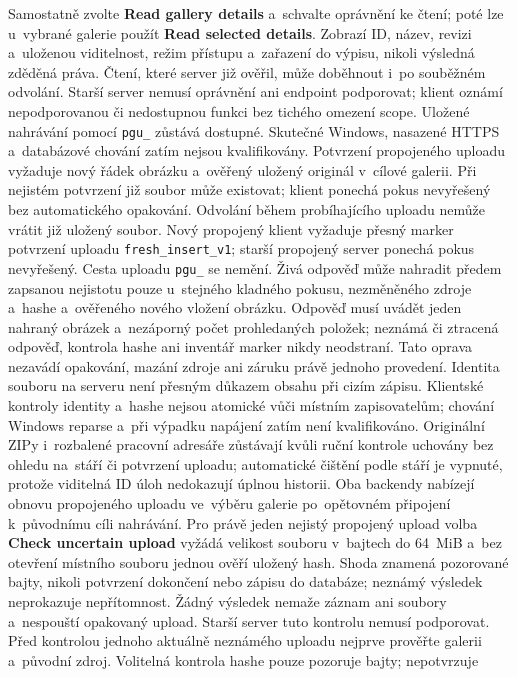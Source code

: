 \documentclass[11pt,a4paper]{article}
\newcommand{\ui}[1]{\textbf{#1}}
\begin{document}
Samostatně zvolte \ui{Read gallery details} a~schvalte oprávnění ke čtení;
poté lze u~vybrané galerie použít \ui{Read selected details}. Zobrazí ID,
název, revizi a~uloženou viditelnost, režim přístupu a~zařazení do výpisu,
nikoli výsledná zděděná práva. Čtení, které server již ověřil, může doběhnout
i~po souběžném odvolání. Starší server nemusí oprávnění ani endpoint
podporovat; klient oznámí nepodporovanou či nedostupnou funkci bez tichého
omezení scope. Uložené nahrávání pomocí \texttt{pgu\_} zůstává dostupné.
Skutečné Windows, nasazené HTTPS a~databázové chování zatím nejsou
kvalifikovány.
Potvrzení propojeného uploadu vyžaduje nový řádek obrázku a~ověřený uložený
originál v~cílové galerii. Při nejistém potvrzení již soubor může existovat;
klient ponechá pokus nevyřešený bez automatického opakování. Odvolání během
probíhajícího uploadu nemůže vrátit již uložený soubor.
Nový propojený klient vyžaduje přesný marker potvrzení uploadu
\texttt{fresh\_insert\_v1}; starší propojený server ponechá pokus nevyřešený.
Cesta uploadu \texttt{pgu\_} se nemění.
Živá odpověď může nahradit předem zapsanou nejistotu pouze u~stejného
kladného pokusu,
nezměněného zdroje a~hashe a~ověřeného nového vložení obrázku. Odpověď musí
uvádět jeden nahraný obrázek a~nezáporný počet prohledaných položek; neznámá
či ztracená odpověď, kontrola hashe ani inventář marker nikdy neodstraní.
Tato oprava nezavádí opakování, mazání zdroje ani záruku právě jednoho provedení.
Identita souboru na serveru není přesným důkazem obsahu při cizím zápisu.
Klientské kontroly identity a~hashe nejsou atomické vůči místním zapisovatelům;
chování Windows reparse a~při výpadku napájení zatím není kvalifikováno.
Originální ZIPy i~rozbalené pracovní adresáře zůstávají kvůli ruční kontrole
uchovány bez ohledu na~stáří či potvrzení uploadu; automatické čištění podle
stáří je vypnuté, protože viditelná ID úloh nedokazují úplnou historii.
Oba backendy nabízejí obnovu propojeného uploadu ve~výběru galerie po~opětovném
připojení k~původnímu cíli nahrávání.
Pro právě jeden nejistý propojený upload volba \ui{Check uncertain upload}
vyžádá velikost souboru v~bajtech do 64~MiB a~bez otevření místního souboru
jednou ověří uložený hash. Shoda znamená
pozorované bajty, nikoli potvrzení dokončení nebo zápisu do databáze; neznámý
výsledek neprokazuje nepřítomnost. Žádný výsledek nemaže záznam ani soubory
a~nespouští opakovaný upload. Starší server tuto kontrolu nemusí podporovat.
Před kontrolou jednoho aktuálně neznámého uploadu nejprve prověřte galerii
a~původní zdroj. Volitelná kontrola hashe pouze pozoruje bajty; nepotvrzuje
\end{document}
